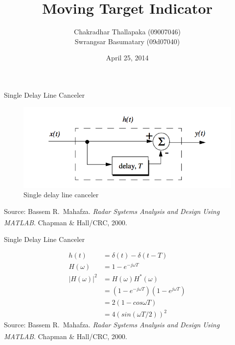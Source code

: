 \documentclass[mathserif]{beamer}
\title{Moving Target Indicator}
\author{Chakradhar Thallapaka (09007046) \\ Swrangsar Basumatary (09d07040) }
\institute{Department of Electrical Engineering \\ IIT Bombay, Powai}
\date{April 25, 2014}
\begin{document}
    \frame{\titlepage}
    
    \begin{frame}{Single Delay Line Canceler}
      \begin{minipage}[t][0.8\textheight][t]{\textwidth}
	\begin{figure}[h]
		\centering
		\includegraphics[width=\linewidth]{singleDLC} 
		\caption{Single delay line canceler}
	\end{figure}
	\vfill
	\tiny{Source: Bassem R.~Mahafza. \emph{Radar Systems Analysis and Design Using MATLAB\textsuperscript{\textregistered}}. Chapman \& Hall/CRC, 2000.} 
      \end{minipage}
    \end{frame}
    

    \begin{frame}{Single Delay Line Canceler}
      \begin{minipage}[t][0.8\textheight][t]{\textwidth}
   	\begin{align}
    	 h(t) & = \delta(t) - \delta(t-T) \nonumber \\
    	 H(\omega) & = 1 - e^{-j\omega T} \nonumber \\
    	 |H(\omega)|^2 & = H(\omega)H^*(\omega) \nonumber \\
    	 & = (1 - e^{-j\omega T})(1 - e^{j\omega T}) \nonumber \\
    	 & = 2(1-cos\omega T) \nonumber \\
    	 & = 4(sin(\omega T/2))^2 \nonumber
    	\end{align}
	\vfill
   	\tiny{Source: Bassem R.~Mahafza. \emph{Radar Systems Analysis and Design Using MATLAB\textsuperscript{\textregistered}}. Chapman \& Hall/CRC, 2000.}
      \end{minipage}
    \end{frame}
    
\end{document}
